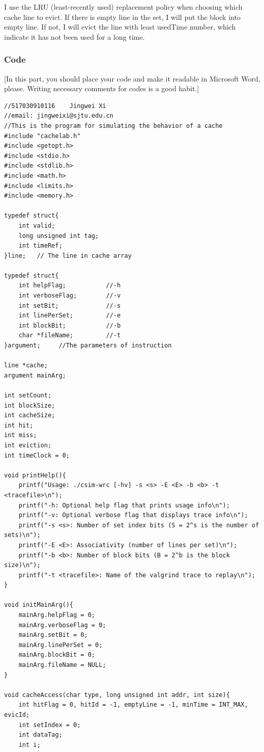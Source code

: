 \documentclass{article}
\begin{document}
I use the LRU (least-recently used) replacement policy when choosing which cache line to evict. If there is empty line in the set, I will put the block into empty line. If not, I will evict the line with least usedTime number, which indicate it has not been used for a long time.

\subsubsection{Code}

[In this part, you should place your code and make it readable in Microsoft Word, please. Writing necessary comments for codes is a good habit.]

\begin{lstlisting}[title=csim.c, frame=shadowbox]
//517030910116    Jingwei Xi
//email: jingweixi@sjtu.edu.cn
//This is the program for simulating the behavior of a cache
#include "cachelab.h"
#include <getopt.h>
#include <stdio.h>
#include <stdlib.h>
#include <math.h>
#include <limits.h>
#include <memory.h>

typedef struct{
    int valid;
    long unsigned int tag;
    int timeRef;
}line;   // The line in cache array

typedef struct{
    int helpFlag;           //-h 
    int verboseFlag;        //-v
    int setBit;             //-s 
    int linePerSet;         //-e
    int blockBit;           //-b
    char *fileName;         //-t
}argument;     //The parameters of instruction

line *cache;
argument mainArg;

int setCount;
int blockSize;
int cacheSize;
int hit;
int miss;
int eviction;
int timeClock = 0;

void printHelp(){
    printf("Usage: ./csim-wrc [-hv] -s <s> -E <E> -b <b> -t <tracefile>\n");
    printf("-h: Optional help flag that prints usage info\n");
    printf("-v: Optional verbose flag that displays trace info\n");
    printf("-s <s>: Number of set index bits (S = 2^s is the number of sets)\n");
    printf("-E <E>: Associativity (number of lines per set)\n");
    printf("-b <b>: Number of block bits (B = 2^b is the block size)\n");
    printf("-t <tracefile>: Name of the valgrind trace to replay\n");
}

void initMainArg(){
    mainArg.helpFlag = 0;
    mainArg.verboseFlag = 0;
    mainArg.setBit = 0;
    mainArg.linePerSet = 0;
    mainArg.blockBit = 0;
    mainArg.fileName = NULL;
}

void cacheAccess(char type, long unsigned int addr, int size){
    int hitFlag = 0, hitId = -1, emptyLine = -1, minTime = INT_MAX, evicId;
    int setIndex = 0;
    int dataTag;
    int i;
    

\end{lstlisting}
\end{document}
